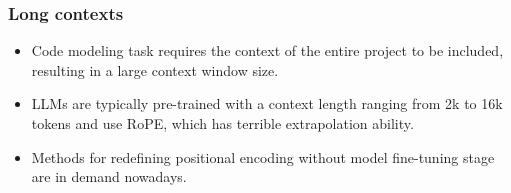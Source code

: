 \documentclass[notheorems,10pt]{beamer}
\begin{document}
\begin{frame}
	\frametitle{Long contexts}

        \begin{itemize}
            \item Code modeling task requires the context of the entire project to be included, resulting in a large context window size.
            \vfill
            \item LLMs are typically pre-trained with a context length ranging from 2k to 16k tokens and use RoPE, which has terrible extrapolation ability.
            \vfill
            \item Methods for redefining positional encoding without model fine-tuning stage are in demand nowadays.
        \end{itemize}


\end{frame}
\end{document}
